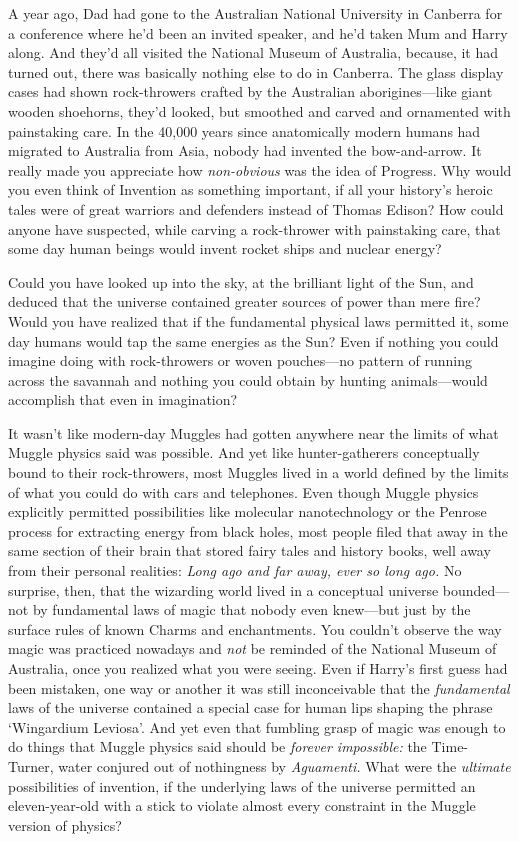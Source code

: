 A year ago, Dad had gone to the Australian National University in Canberra for
a conference where he'd been an invited speaker, and he'd taken Mum and Harry
along. And they'd all visited the National Museum of Australia, because, it had
turned out, there was basically nothing else to do in Canberra. The glass
display cases had shown rock-throwers crafted by the Australian
aborigines---like giant wooden shoehorns, they'd looked, but smoothed and
carved and ornamented with painstaking care. In the 40,000 years since
anatomically modern humans had migrated to Australia from Asia, nobody had
invented the bow-and-arrow. It really made you appreciate how
\emph{non-obvious} was the idea of Progress. Why would you even think of
Invention as something important, if all your history's heroic tales were of
great warriors and defenders instead of Thomas Edison? How could anyone have
suspected, while carving a rock-thrower with painstaking care, that some day
human beings would invent rocket ships and nuclear energy?

Could you have looked up into the sky, at the brilliant light of the Sun, and
deduced that the universe contained greater sources of power than mere fire?
Would you have realized that if the fundamental physical laws permitted it,
some day humans would tap the same energies as the Sun? Even if nothing you
could imagine doing with rock-throwers or woven pouches---no pattern of running
across the savannah and nothing you could obtain by hunting animals---would
accomplish that even in imagination?

It wasn't like modern-day Muggles had gotten anywhere near the limits of what
Muggle physics said was possible. And yet like hunter-gatherers conceptually
bound to their rock-throwers, most Muggles lived in a world defined by the
limits of what you could do with cars and telephones. Even though Muggle
physics explicitly permitted possibilities like molecular nanotechnology or the
Penrose process for extracting energy from black holes, most people filed that
away in the same section of their brain that stored fairy tales and history
books, well away from their personal realities: \emph{Long ago and far away,
ever so long ago.} No surprise, then, that the wizarding world lived in a
conceptual universe bounded---not by fundamental laws of magic that nobody even
knew---but just by the surface rules of known Charms and enchantments. You
couldn't observe the way magic was practiced nowadays and \emph{not} be
reminded of the National Museum of Australia, once you realized what you were
seeing. Even if Harry's first guess had been mistaken, one way or another it
was still inconceivable that the \emph{fundamental} laws of the universe
contained a special case for human lips shaping the phrase `Wingardium
Leviosa'. And yet even that fumbling grasp of magic was enough to do things
that Muggle physics said should be \emph{forever impossible:} the Time-Turner,
water conjured out of nothingness by \emph{Aguamenti.} What were the
\emph{ultimate} possibilities of invention, if the underlying laws of the
universe permitted an eleven-year-old with a stick to violate almost every
constraint in the Muggle version of physics?

